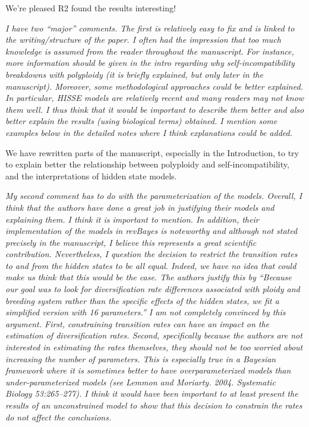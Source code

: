 \documentclass[11pt]{article}
\renewenvironment{quote}{\bigskip\noindent\itshape\ignorespaces}{\smallskip}
\begin{document}
We're pleased R2 found the results interesting!


\begin{quote}
I have two ``major'' comments.
The first is relatively easy to fix and is linked to the writing/structure of the paper.
I often had the impression that too much knowledge is assumed from the reader throughout the manuscript.
For instance, more information should be given in the intro regarding why self-incompatibility breakdowns with polyploidy (it is briefly explained, but only later in the manuscript).
Moreover, some methodological approaches could be better explained.
In particular, HISSE models are relatively recent and many readers may not know them well.
I thus think that it would be important to describe them better and also better explain the results (using biological terms) obtained.
I mention some examples below in the detailed notes where I think explanations could be added.
\end{quote}

We have rewritten parts of the manuscript, especially in the Introduction, to try to explain better the relationship between polyploidy and self-incompatibility, and the interpretations of hidden state models.


\begin{quote}
My second comment has to do with the parameterization of the models.
Overall, I think that the authors have done a great job in justifying their models and explaining them.
I think it is important to mention.
In addition, their implementation of the models in revBayes is noteworthy and although not stated precisely in the manuscript, I believe this represents a great scientific contribution. 
Nevertheless, I question the decision to restrict the transition rates to and from the hidden states to be all equal.
Indeed, we have no idea that could make us think that this would be the case.
The authors justify this by ``Because our goal was to look for diversification rate differences associated with ploidy and breeding system rather than the specific effects of the hidden states, we fit a simplified version with 16 parameters.''
I am not completely convinced by this argument.
First, constraining transition rates can have an impact on the estimation of diversification rates.
Second, specifically because the authors are not interested in estimating the rates themselves, they should not be too worried about increasing the number of parameters.
This is especially true in a Bayesian framework where it is sometimes better to have overparameterized models than under-parameterized models (see Lemmon and Moriarty. 2004. Systematic Biology 53:265--277).
I think it would have been important to at least present the results of an unconstrained model to show that this decision to constrain the rates do not affect the conclusions.
\end{quote}
\end{document}

